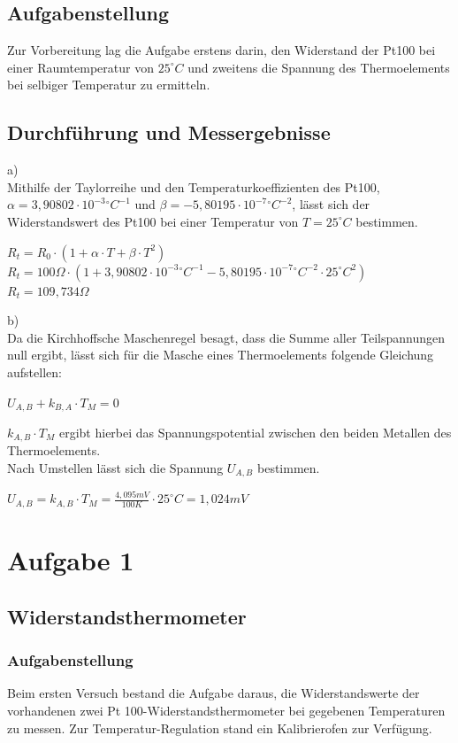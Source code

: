 \documentclass[a4paper,11pt,oneside]{article}
\begin{document}
\subsection{Aufgabenstellung}
Zur Vorbereitung lag die Aufgabe erstens darin, den Widerstand der Pt100 bei einer Raumtemperatur von $25^ \circ C$ und zweitens die Spannung des Thermoelements bei selbiger Temperatur zu ermitteln.
\subsection{Durchführung und Messergebnisse}
a)\\
Mithilfe der Taylorreihe und den Temperaturkoeffizienten des Pt100, $\alpha = 3,90802   \cdot 10^{-3} {}^\circ C^{-1}$ und $\beta = -5,80195 \cdot 10^{-7} {}^\circ C^{-2}$, lässt sich der Widerstandswert des Pt100 bei einer Temperatur von $T = 25^\circ C$ bestimmen.

\begin{center}
$R_t = R_0 \cdot (1 + \alpha \cdot T + \beta \cdot T^2)$ \\
$R_t = 100 \Omega \cdot (1 + 3,90802 \cdot 10^{-3} {}^\circ C^{-1} - 5,80195 \cdot 10^{-7}{}^\circ C ^{-2} \cdot 25 ^\circ C ^2)$ \\
$R_t = 109,734 \Omega$
\end{center}
b)\\
Da die Kirchhoffsche Maschenregel besagt, dass die Summe aller Teilspannungen null ergibt, lässt sich für die Masche eines Thermoelements folgende Gleichung aufstellen: 
\begin{center}
$U_{A,B} + k_{B,A} \cdot T_M = 0$
\end{center}
$k_{A,B} \cdot T_M$ ergibt hierbei das Spannungspotential zwischen den beiden Metallen des Thermoelements.\\
Nach Umstellen lässt sich die Spannung $U_{A,B}$ bestimmen.
\begin{center}
$U_{A,B} = k_{A,B} \cdot T_M = \frac{4,095mV}{100K} \cdot 25^\circ C = 1,024mV$
\end{center}

\section{Aufgabe 1}
\subsection{Widerstandsthermometer}
\subsubsection{Aufgabenstellung}
Beim ersten Versuch bestand die Aufgabe daraus, die Widerstandswerte der vorhandenen zwei Pt 100-Widerstandsthermometer bei gegebenen Temperaturen zu messen. Zur Temperatur-Regulation stand ein Kalibrierofen zur Verfügung. \\
\end{document}
